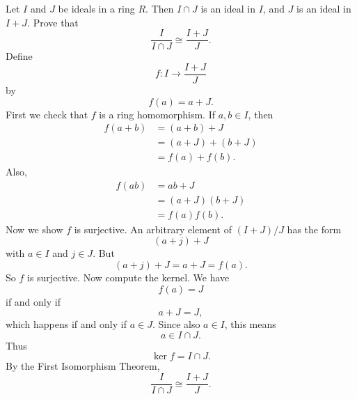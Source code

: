 \begin{problem}{
    Let $I$ and $J$ be ideals in a ring $R$.
    Then $I\cap J$ is an ideal in $I$, and $J$ is an ideal in $I+J$.
    Prove that
    \[
        \frac{I}{I\cap J} \cong \frac{I+J}{J}.
    \]
}
    Define
    \[
        f:I\to \frac{I+J}{J}
    \]
    by
    \[
        f(a) = a+J.
    \]
    First we check that $f$ is a ring homomorphism.
    If $a,b\in I$, then
    \begin{align*}
        f(a+b)
        &=
        (a+b)+J\\
        &=
        (a+J)+(b+J)\\
        &=
        f(a)+f(b).
    \end{align*}
    Also,
    \begin{align*}
        f(ab)
        &=
        ab+J\\
        &=
        (a+J)(b+J)\\
        &=
        f(a)f(b).
    \end{align*}
    Now we show $f$ is surjective.
    An arbitrary element of $(I+J)/J$ has the form
    \[
        (a+j)+J
    \]
    with $a\in I$ and $j\in J$.
    But
    \[
        (a+j)+J = a+J = f(a).
    \]
    So $f$ is surjective.
    Now compute the kernel.
    We have
    \[
        f(a)=J
    \]
    if and only if
    \[
        a+J = J,
    \]
    which happens if and only if $a\in J$.
    Since also $a\in I$, this means
    \[
        a\in I\cap J.
    \]
    Thus
    \[
        \ker f = I\cap J.
    \]
    By the First Isomorphism Theorem,
    \[
        \frac{I}{I\cap J} \cong \frac{I+J}{J}.
    \]
\end{problem}